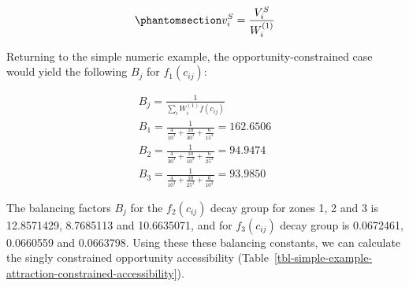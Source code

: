 \documentclass[
  10pt,
  letterpaper,
]{article}
\begin{document}
\begin{equation}\phantomsection\label{eq-opportunity-constrained-accessibility-per-capita}{
v^S_{i} = \frac{V^S_{i}}{W^{(1)}_i}
}\end{equation}

Returning to the simple numeric example, the opportunity-constrained
case would yield the following \(B_{j}\) for \(f_1(c_{ij})\):

\[
\begin{array}{l}
B_{j} = \frac{1}{\sum_i W_i^{(1)} f(c_{ij})}\\
B_{1} =  \frac{1}{\frac{4}{10^3} + \frac{10}{30^3} + \frac{6}{15^3}} = 162.6506\\ 
B_{2} =  \frac{1}{\frac{4}{30^3} + \frac{10}{10^3} + \frac{6}{25^3}} = 94.9474\\
B_{3} =  \frac{1}{\frac{4}{10^3} + \frac{10}{25^3} + \frac{6}{10^3}} = 93.9850
\end{array}
\]

The balancing factors \(B_j\) for the \(f_2(c_{ij})\) decay group for
zones 1, 2 and 3 is 12.8571429, 8.7685113 and 10.6635071, and for
\(f_3(c_{ij})\) decay group is 0.0672461, 0.0660559 and 0.0663798. Using
these these balancing constants, we can calculate the singly constrained
opportunity accessibility
(Table~\ref{tbl-simple-example-attraction-constrained-accessibility}).

\begin{table}

\caption{\label{tbl-simple-example-attraction-constrained-accessibility}Simple
system: singly constrained accessible opportunities.}


\end{table}%
\end{document}
